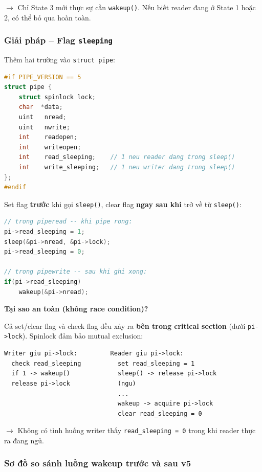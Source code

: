 \documentclass[11pt,a4paper]{article}
\begin{document}
$\rightarrow$ Chỉ State 3 mới thực sự cần \texttt{wakeup()}. Nếu biết reader đang ở State 1 hoặc 2, có thể bỏ qua hoàn toàn.

\subsubsection{Giải pháp -- Flag \texttt{sleeping}}

Thêm hai trường vào \texttt{struct pipe}:

\begin{lstlisting}[language=C]
#if PIPE_VERSION == 5
struct pipe {
    struct spinlock lock;
    char  *data;
    uint   nread;
    uint   nwrite;
    int    readopen;
    int    writeopen;
    int    read_sleeping;    // 1 neu reader dang trong sleep()
    int    write_sleeping;   // 1 neu writer dang trong sleep()
};
#endif
\end{lstlisting}

Set flag \textbf{trước} khi gọi \texttt{sleep()}, clear flag \textbf{ngay sau khi} trở về từ \texttt{sleep()}:

\begin{lstlisting}[language=C]
// trong piperead -- khi pipe rong:
pi->read_sleeping = 1;
sleep(&pi->nread, &pi->lock);
pi->read_sleeping = 0;

// trong pipewrite -- sau khi ghi xong:
if(pi->read_sleeping)
    wakeup(&pi->nread);
\end{lstlisting}

\textbf{Tại sao an toàn (không race condition)?}

Cả set/clear flag và check flag đều xảy ra \textbf{bên trong critical section} (dưới \texttt{pi->lock}). Spinlock đảm bảo mutual exclusion:

\begin{lstlisting}[style=plain]
Writer giu pi->lock:         Reader giu pi->lock:
  check read_sleeping          set read_sleeping = 1
  if 1 -> wakeup()             sleep() -> release pi->lock
  release pi->lock             (ngu)
                               ...
                               wakeup -> acquire pi->lock
                               clear read_sleeping = 0
\end{lstlisting}

$\rightarrow$ Không có tình huống writer thấy \texttt{read\_sleeping = 0} trong khi reader thực ra đang ngủ.

\subsubsection{Sơ đồ so sánh luồng wakeup trước và sau v5}
\end{document}
